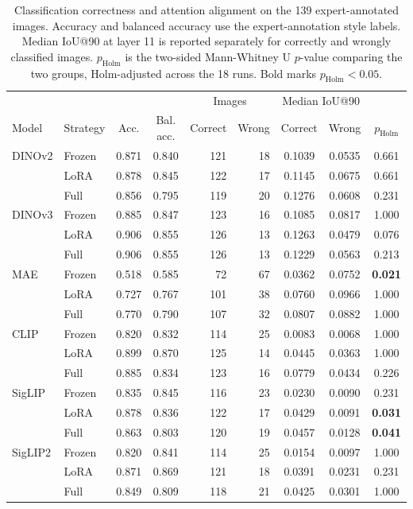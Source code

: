 \documentclass[lineno,pdflatex,sn-mathphys-num]{sn-jnl}%
\theoremstyle{thmstyleone}%
\theoremstyle{thmstyletwo}%
\theoremstyle{thmstylethree}%
\begin{document}
\begin{table}[!htbp]
\centering
\caption{Classification correctness and attention alignment on the 139 expert-annotated images. Accuracy and balanced accuracy use the expert-annotation style labels. Median IoU@90 at layer 11 is reported separately for correctly and wrongly classified images. $p_{\text{Holm}}$ is the two-sided Mann-Whitney U $p$-value comparing the two groups, Holm-adjusted across the 18 runs. Bold marks $p_{\text{Holm}} < 0.05$.\label{table RQ3 correctness}}
\begin{tabular}{llccrrccc}
\toprule
 & & & & \multicolumn{2}{c}{Images} & \multicolumn{2}{c}{Median IoU@90} & \\
Model & Strategy & Acc. & Bal. acc. & Correct & Wrong & Correct & Wrong & $p_{\text{Holm}}$ \\ \midrule
DINOv2   & Frozen & 0.871 & 0.840 & 121 & 18 & 0.1039 & 0.0535 & 0.661 \\
         & LoRA   & 0.878 & 0.845 & 122 & 17 & 0.1145 & 0.0675 & 0.661 \\
         & Full   & 0.856 & 0.795 & 119 & 20 & 0.1276 & 0.0608 & 0.231 \\ \midrule
DINOv3   & Frozen & 0.885 & 0.847 & 123 & 16 & 0.1085 & 0.0817 & 1.000 \\
         & LoRA   & 0.906 & 0.855 & 126 & 13 & 0.1263 & 0.0479 & 0.076 \\
         & Full   & 0.906 & 0.855 & 126 & 13 & 0.1229 & 0.0563 & 0.213 \\ \midrule
MAE      & Frozen & 0.518 & 0.585 & 72 & 67 & 0.0362 & 0.0752 & \textbf{0.021} \\
         & LoRA   & 0.727 & 0.767 & 101 & 38 & 0.0760 & 0.0966 & 1.000 \\
         & Full   & 0.770 & 0.790 & 107 & 32 & 0.0807 & 0.0882 & 1.000 \\ \midrule
CLIP     & Frozen & 0.820 & 0.832 & 114 & 25 & 0.0083 & 0.0068 & 1.000 \\
         & LoRA   & 0.899 & 0.870 & 125 & 14 & 0.0445 & 0.0363 & 1.000 \\
         & Full   & 0.885 & 0.834 & 123 & 16 & 0.0779 & 0.0434 & 0.226 \\ \midrule
SigLIP   & Frozen & 0.835 & 0.845 & 116 & 23 & 0.0230 & 0.0090 & 0.231 \\
         & LoRA   & 0.878 & 0.836 & 122 & 17 & 0.0429 & 0.0091 & \textbf{0.031} \\
         & Full   & 0.863 & 0.803 & 120 & 19 & 0.0457 & 0.0128 & \textbf{0.041} \\ \midrule
SigLIP2  & Frozen & 0.820 & 0.841 & 114 & 25 & 0.0154 & 0.0097 & 1.000 \\
         & LoRA   & 0.871 & 0.869 & 121 & 18 & 0.0391 & 0.0231 & 0.231 \\
         & Full   & 0.849 & 0.809 & 118 & 21 & 0.0425 & 0.0301 & 1.000 \\
\bottomrule
\end{tabular}
\end{table}
\end{document}
